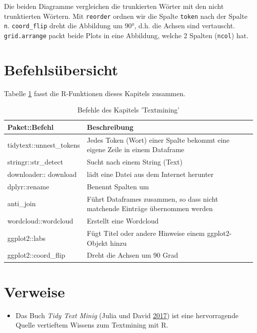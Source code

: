 \documentclass[12pt,ngerman,]{book}
\providecommand{\tightlist}{%
  \setlength{\itemsep}{0pt}\setlength{\parskip}{0pt}}
\begin{document}
Die beiden Diagramme vergleichen die trunkierten Wörter mit den nicht
trunktierten Wörtern. Mit \texttt{reorder} ordnen wir die Spalte
\texttt{token} nach der Spalte \texttt{n}. \texttt{coord\_flip} dreht
die Abbildung um 90°, d.h. die Achsen sind vertauscht.
\texttt{grid.arrange} packt beide Plots in eine Abbildung, welche 2
Spalten (\texttt{ncol}) hat.

\section{Befehlsübersicht}\label{befehlsubersicht-10}

Tabelle \ref{tab:befehle-text} fasst die R-Funktionen dieses Kapitels
zusammen.

\begin{table}

\caption{\label{tab:befehle-text}Befehle des Kapitels 'Textmining'}
\centering
\begin{tabular}[t]{l|l}
\hline
Paket::Befehl & Beschreibung\\
\hline
tidytext::unnest\_tokens & Jedes Token (Wort) einer Spalte bekommt eine eigene Zeile in einem Dataframe\\
\hline
stringr::str\_detect & Sucht nach einem String (Text)\\
\hline
downloader:: download & lädt eine Datei aus dem Internet herunter\\
\hline
dplyr::rename & Benennt Spalten um\\
\hline
anti\_join & Führt Dataframes zusammen, so dass nicht matchende Einträge übernommen werden\\
\hline
wordcloud::wordcloud & Erstellt eine Wordcloud\\
\hline
ggplot2::labs & Fügt Titel oder andere Hinweise einem ggplot2-Objekt hinzu\\
\hline
ggplot2::coord\_flip & Dreht die Achsen um 90 Grad\\
\hline
\end{tabular}
\end{table}

\section{Verweise}\label{verweise-8}

\begin{itemize}
\tightlist
\item
  Das Buch \emph{Tidy Text Minig} (Julia und David
  \protect\hyperlink{ref-tidytextminig}{2017}) ist eine hervorragende
  Quelle vertieftem Wissens zum Textmining mit R.
\end{itemize}
\end{document}
